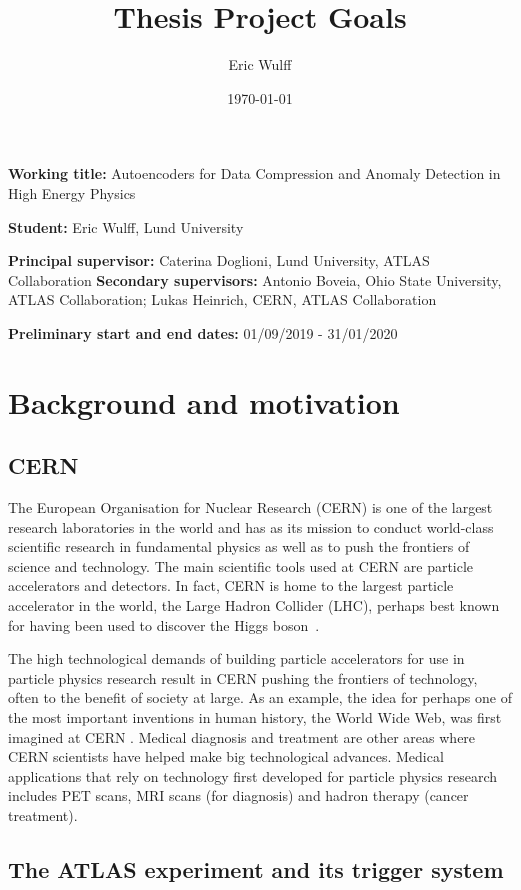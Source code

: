 \documentclass[11pt]{article}
\title{\huge Thesis Project Goals}
\author{Eric Wulff}
\date{\today}
\begin{document}
\maketitle

\textbf{Working title:} Autoencoders for Data Compression and Anomaly Detection in High Energy Physics

\textbf{Student:} Eric Wulff, Lund University

\textbf{Principal supervisor:} Caterina Doglioni, Lund University, ATLAS Collaboration
\textbf{Secondary supervisors:} Antonio Boveia, Ohio State University, ATLAS Collaboration; Lukas Heinrich, CERN, ATLAS Collaboration

\textbf{Preliminary start and end dates:} 01/09/2019 - 31/01/2020

\section{Background and motivation}

\subsection{CERN}

The European Organisation for Nuclear Research (CERN) is one of the largest research laboratories in the world and has as its mission to conduct world-class scientific research in fundamental physics as well as to push the frontiers of science and technology. The main scientific tools used at CERN are particle accelerators and detectors. In fact, CERN is home to the largest particle accelerator in the world, the Large Hadron Collider (LHC), perhaps best known for having been used to discover the Higgs boson~\cite{higgs_discovery}.

The high technological demands of building particle accelerators for use in particle physics research result in CERN pushing the frontiers of technology, often to the benefit of society at large. As an example, the idea for perhaps one of the most important inventions in human history, the World Wide Web, was first imagined at CERN \cite{www}. Medical diagnosis and treatment are other areas where CERN scientists have helped make big technological advances. Medical applications that rely on technology first developed for particle physics research includes PET scans, MRI scans (for diagnosis) and hadron therapy (cancer treatment).

\subsection{The ATLAS experiment and its trigger system}
\end{document}
